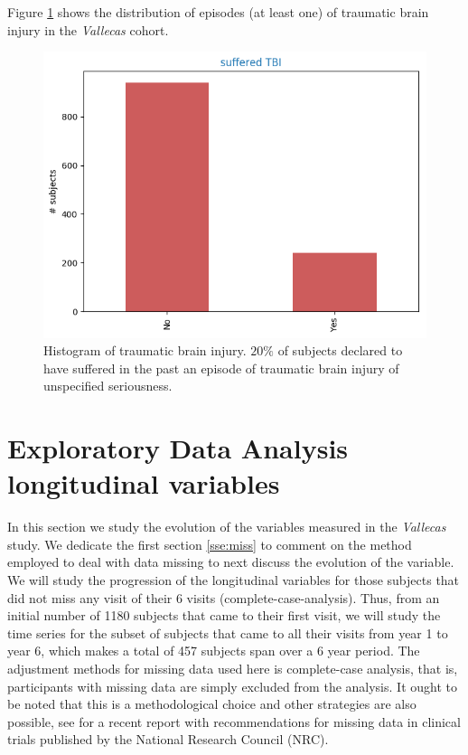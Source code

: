 \documentclass[11pt]{article}
\theoremstyle{definition}
\theoremstyle{remark}
\begin{document}
Figure \ref{fig:tce} shows the distribution of episodes (at least one) of traumatic brain injury in the \emph{Vallecas} cohort. 

\begin{figure}[H]
        \centering
        \includegraphics[keepaspectratio, width=0.4\linewidth]{figures/Fig_tce}
        \caption{Histogram of traumatic brain injury. $20\%$ of subjects declared to have suffered in the past an episode of traumatic brain injury of unspecified seriousness.} 
        \label{fig:tce}
\end{figure}

\section{Exploratory Data Analysis longitudinal variables}
\label{se:eda_long}
In this section we study the evolution of the variables measured in the \emph{Vallecas} study. We dedicate the first section \ref{sse:miss} to comment on the method employed to deal with data missing to next discuss the evolution of the variable. 
We will study the progression of the longitudinal variables for those subjects that did not miss any visit of their 6 visits (complete-case-analysis). Thus, from an initial number of 1180 subjects that came to their first visit, we will study the time series for the subset of subjects that came to all their visits from year 1 to year 6, which makes a total of 457 subjects span over a 6 year period.
The adjustment methods for missing data used here is complete-case analysis, that is, participants with missing data are simply excluded from the analysis. It ought to be noted that this is a methodological choice and other strategies are also possible, see \cite{national2010prevention} for a recent report with recommendations for missing data in clinical trials published by the National Research Council (NRC). 
\end{document}
